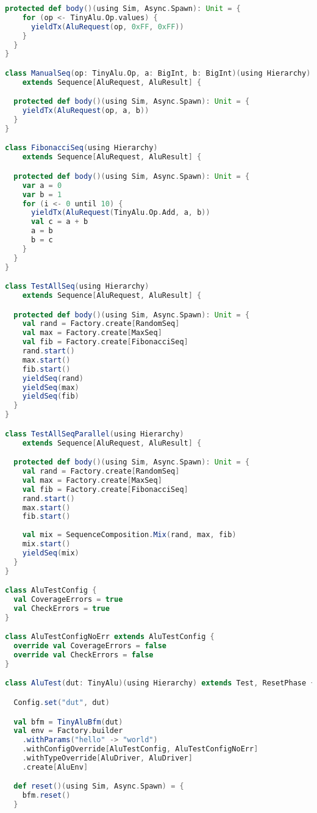 \begin{lstlisting}[language=scala, captionpos=b, caption=Test code for the tiny ALU.,label=lst:alu_test]
  protected def body()(using Sim, Async.Spawn): Unit = {
    for (op <- TinyAlu.Op.values) {
      yieldTx(AluRequest(op, 0xFF, 0xFF))
    }
  }
}

class ManualSeq(op: TinyAlu.Op, a: BigInt, b: BigInt)(using Hierarchy)
    extends Sequence[AluRequest, AluResult] {

  protected def body()(using Sim, Async.Spawn): Unit = {
    yieldTx(AluRequest(op, a, b))
  }
}

class FibonacciSeq(using Hierarchy)
    extends Sequence[AluRequest, AluResult] {

  protected def body()(using Sim, Async.Spawn): Unit = {
    var a = 0
    var b = 1
    for (i <- 0 until 10) {
      yieldTx(AluRequest(TinyAlu.Op.Add, a, b))
      val c = a + b
      a = b
      b = c
    }
  }
}

class TestAllSeq(using Hierarchy)
    extends Sequence[AluRequest, AluResult] {

  protected def body()(using Sim, Async.Spawn): Unit = {
    val rand = Factory.create[RandomSeq]
    val max = Factory.create[MaxSeq]
    val fib = Factory.create[FibonacciSeq]
    rand.start()
    max.start()
    fib.start()
    yieldSeq(rand)
    yieldSeq(max)
    yieldSeq(fib)
  }
}

class TestAllSeqParallel(using Hierarchy)
    extends Sequence[AluRequest, AluResult] {

  protected def body()(using Sim, Async.Spawn): Unit = {
    val rand = Factory.create[RandomSeq]
    val max = Factory.create[MaxSeq]
    val fib = Factory.create[FibonacciSeq]
    rand.start()
    max.start()
    fib.start()
    
    val mix = SequenceComposition.Mix(rand, max, fib)
    mix.start()
    yieldSeq(mix)
  }
}

class AluTestConfig {
  val CoverageErrors = true
  val CheckErrors = true
}

class AluTestConfigNoErr extends AluTestConfig {
  override val CoverageErrors = false
  override val CheckErrors = false
}

class AluTest(dut: TinyAlu)(using Hierarchy) extends Test, ResetPhase {

  Config.set("dut", dut)

  val bfm = TinyAluBfm(dut)
  val env = Factory.builder
    .withParams("hello" -> "world")
    .withConfigOverride[AluTestConfig, AluTestConfigNoErr]
    .withTypeOverride[AluDriver, AluDriver]
    .create[AluEnv]

  def reset()(using Sim, Async.Spawn) = {
    bfm.reset()
  }


\end{lstlisting}
